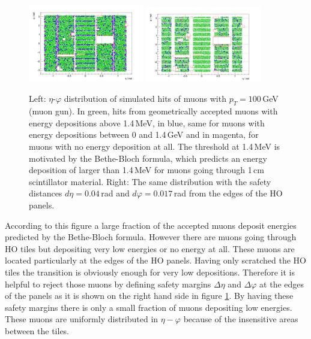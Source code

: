 			\begin{figure}[htbp]
				\centering
				\includegraphics[width=0.45\textwidth]{Figures/erdogan/simhits_wo_deta_dphi.png}
				\includegraphics[width=0.45\textwidth]{Figures/erdogan/simhits_with_deta_dphi.png}
				\caption{Left: $\eta$-$\varphi$ distribution of simulated hits of muons with $p_T = 100$\,GeV (muon gun). In green, hits from geometrically accepted muons with energy depositions above 1.4\,MeV, in
				blue, same for muons with energy depositions between 0 and 1.4\,GeV and in magenta, for muons with no energy deposition at all. The threshold at 1.4\,MeV is motivated by the Bethe-Bloch formula,
				which predicts an energy deposition of larger than 1.4\,MeV for muons going through 1\,cm scintillator material. Right: The same distribution with the safety distances $d\eta = 0.04$\,rad and
				$d\varphi = 0.017$\,rad from the edges of the HO panels.}
				\label{fig:simhits_in_acceptance}
			\end{figure}
			According to this figure a large fraction of the accepted muons deposit energies predicted by the Bethe-Bloch formula.
			However there are muons going through HO tiles but depositing very low energies or no energy at all.
			These muons are located particularly at the edges of the HO panels.
			Having only scratched the HO tiles the transition is obviously enough for very low depositions.
			Therefore it is helpful to reject those muons by defining safety margins $\Delta\eta$ and $\Delta\varphi$ at the edges of the panels as it is shown on the right hand side in figure
			\ref{fig:simhits_in_acceptance}.
			By having these safety margins there is only a small fraction of muons depositing low energies.
			These muons are uniformly distributed in $\eta-\varphi$ because of the insensitive areas between the tiles.
